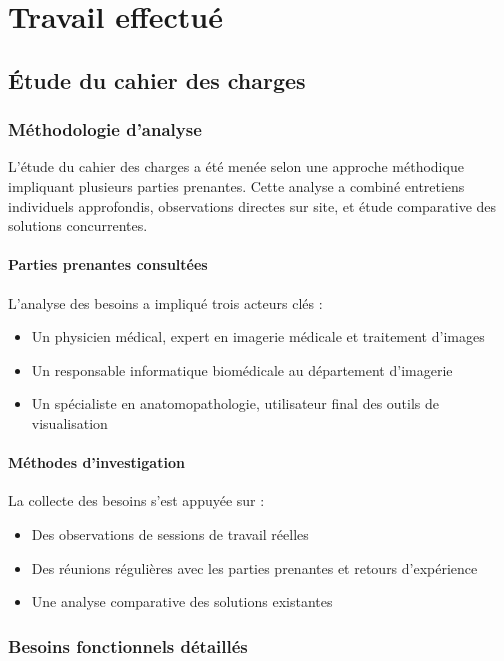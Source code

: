 \documentclass[12pt,a4paper]{report}
\begin{document}
\chapter{Travail effectué}

\section{Étude du cahier des charges}

\subsection{Méthodologie d'analyse}

L'étude du cahier des charges a été menée selon une approche méthodique impliquant plusieurs parties prenantes. Cette analyse a combiné entretiens individuels approfondis, observations directes sur site, et étude comparative des solutions concurrentes.

\subsubsection{Parties prenantes consultées}

L'analyse des besoins a impliqué trois acteurs clés :
\begin{itemize}
\item Un physicien médical, expert en imagerie médicale et traitement d'images
\item Un responsable informatique biomédicale au département d'imagerie
\item Un spécialiste en anatomopathologie, utilisateur final des outils de visualisation
\end{itemize}

\subsubsection{Méthodes d'investigation}

La collecte des besoins s'est appuyée sur :
\begin{itemize}
\item Des observations de sessions de travail réelles
\item Des réunions régulières avec les parties prenantes et retours d'expérience
\item Une analyse comparative des solutions existantes
\end{itemize}

\subsection{Besoins fonctionnels détaillés}
\end{document}

